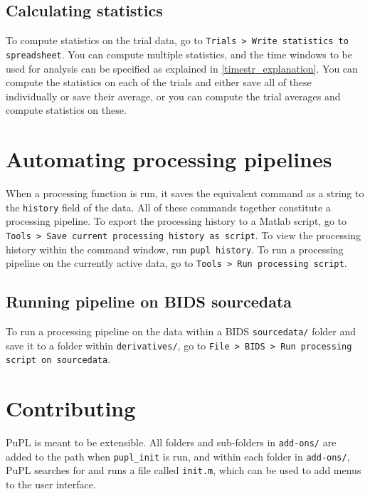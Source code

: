 \documentclass{article}
\newcommand{\erp}{Trials }
\begin{document}
\subsection{Calculating statistics}
To compute statistics on the trial data, go to \texttt{\erp > Write statistics to spreadsheet}. You can compute multiple statistics, and the time windows to be used for analysis can be specified as explained in \ref{timestr_explanation}. You can compute the statistics on each of the trials and either save all of these individually or save their average, or you can compute the trial averages and compute statistics on these.
\section{Automating processing pipelines}
When a processing function is run, it saves the equivalent command as a string to the \texttt{history} field of the data. All of these commands together constitute a processing pipeline. To export the processing history to a Matlab script, go to \texttt{Tools > Save current processing history as script}. To view the processing history within the command window, run \texttt{pupl history}. To run a processing pipeline on the currently active data, go to \texttt{Tools > Run processing script}.
\subsection{Running pipeline on BIDS sourcedata}
To run a processing pipeline on the data within a BIDS \texttt{sourcedata/} folder and save it to a folder within \texttt{derivatives/}, go to \texttt{File > BIDS > Run processing script on sourcedata}.
\section{Contributing}
PuPL is meant to be extensible. All folders and sub-folders in \texttt{add-ons/} are added to the path when \texttt{pupl\_init} is run, and within each folder in \texttt{add-ons/}, PuPL searches for and runs a file called \texttt{init.m}, which can be used to add menus to the user interface.
\end{document}
